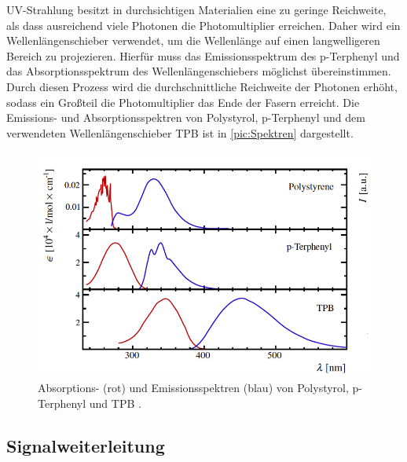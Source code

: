 UV-Strahlung besitzt in durchsichtigen Materialien eine zu geringe Reichweite, als dass ausreichend viele Photonen die Photomultiplier
erreichen. Daher wird ein Wellenlängenschieber verwendet, um die Wellenlänge auf einen langwelligeren Bereich
zu projezieren. Hierfür muss das Emissionsspektrum des p-Terphenyl und das Absorptionsspektrum des Wellenlängenschiebers
möglichst übereinstimmen. Durch diesen Prozess wird die durchschnittliche Reichweite der Photonen erhöht, sodass
ein Großteil die Photomultiplier das Ende der Fasern erreicht. Die Emissions- und Absorptionsspektren von Polystyrol,
p-Terphenyl und dem verwendeten Wellenlängenschieber TPB ist in \autoref{pic:Spektren} dargestellt.
\begin{figure}
    \centering
    \includegraphics[width = .8\textwidth]{content/pics/Spektren.png}
    \caption{Absorptions- (rot) und Emissionsspektren (blau) von Polystyrol, p-Terphenyl und TPB \cite{SciFi_Versuch}.}
    \label{pic:Spektren}
\end{figure}

\subsection{Signalweiterleitung}

